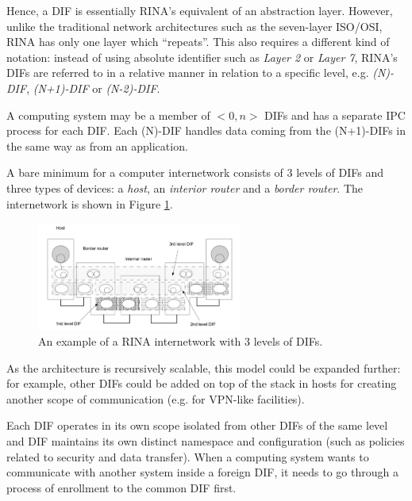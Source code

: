                 Hence, a DIF is essentially RINA's equivalent of an abstraction layer. However, unlike the traditional network architectures such as the seven-layer ISO/OSI, RINA has only one layer which ``repeats''. This also requires a different kind of notation: instead of using absolute identifier such as \emph{Layer 2} or \emph{Layer 7}, RINA's DIFs are referred to in a relative manner in relation to a specific level, e.g. \emph{(N)-DIF}, \emph{(N+1)-DIF} or \emph{(N-2)-DIF}.

                A computing system may be a member of $<0,n>$ DIFs and has a separate IPC process for each DIF. Each (N)-DIF handles data coming from the (N+1)-DIFs in the same way as from an application.

                A bare minimum for a computer internetwork consists of 3 levels of DIFs and three types of devices: a \emph{host}, an \emph{interior router} and a \emph{border router}. The internetwork is shown in Figure \ref{fig:rina_internetwork}.

                \begin{figure}[H]
                    \begin{center}
                        \includegraphics[width=0.6\textwidth]{fig/archs_rina-net.png}
                      \caption{An example of a RINA internetwork with 3 levels of DIFs.}
                      \label{fig:rina_internetwork}
                    \end{center}
                \end{figure}

                As the architecture is recursively scalable, this model could be expanded further: for example, other DIFs could be added on top of the stack in hosts for creating another scope of communication (e.g. for VPN-like facilities).

                Each DIF operates in its own scope isolated from other DIFs of the same level and DIF maintains its own distinct namespace and configuration (such as policies related to security and data transfer). When a computing system wants to communicate with another system inside a foreign DIF, it needs to go through a process of enrollment to the common DIF first.

